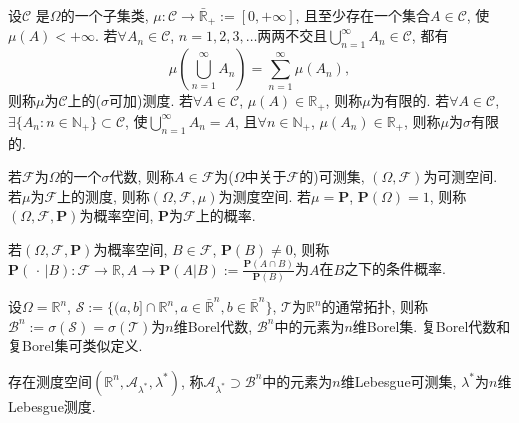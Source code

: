 \begin{definition}
    设$\mathcal{C}$ 是$\Omega$的一个子集类, $\mu\colon \mathcal{C}\to\bar{\mathbb{R} }_+:=[0,+\infty]$, 且至少存在一个集合$A\in\mathcal{C}$, 使$\mu(A)<+\infty$. 若$\forall A_n\in\mathcal{C}$, $n=1,2,3,\dots$两两不交且$\bigcup_{n=1}^{\infty}A_n\in\mathcal{C}$, 都有\begin{equation*}
        \mu\left(\bigcup_{n=1}^{\infty}A_n\right)=\sum_{n=1}^{\infty}\mu\left(A_n\right),
    \end{equation*}则称$\mu$为$\mathcal{C}$上的($\sigma$可加)测度. 若$\forall A\in\mathcal{C}$, $\mu(A)\in\mathbb{R}_+$, 则称$\mu$为有限的. 若$\forall A\in\mathcal{C}$, $\exists\{A_n\colon n\in\mathbb{N}_+\}\subset\mathcal{C} $, 使$\bigcup_{n=1}^{\infty}A_n=A$, 且$\forall n\in\mathbb{N}_+$, $\mu(A_n)\in\mathbb{R}_+$, 则称$\mu$为$\sigma$有限的. 
\end{definition}

\begin{definition}
    若$\mathcal{F}$为$\Omega$的一个$\sigma$代数, 则称$A\in\mathcal{F}$为($\Omega$中关于$\mathcal{F}$的)可测集, $(\Omega,\mathcal{F})$为可测空间. 若$\mu$为$\mathcal{F}$上的测度, 则称$(\Omega,\mathcal{F},\mu)$为测度空间. 若$\mu=\mathbf{P}$, $\mathbf{P}(\Omega)=1$, 则称$(\Omega,\mathcal{F},\mathbf{P})$为概率空间, $\mathbf{P}$为$\mathcal{F}$上的概率.
\end{definition}

\begin{definition}
    若$(\Omega,\mathcal{F},\mathbf{P})$为概率空间, $B\in\mathcal{F}$, $\mathbf{P}(B)\ne 0$, 则称$\mathbf{P}(\,\cdot\,|B)\colon \mathcal{F}\to\mathbb{R}, A\to\mathbf{P}(A|B):=\frac{\mathbf{P}(A\cap B)}{\mathbf{P}(B)}$为$A$在$B$之下的条件概率.
\end{definition}

\begin{definition}
    设$\Omega=\mathbb{R}^n$, $\mathscr{S}:=\{(a,b]\cap\mathbb{R}^n,a\in\bar{\mathbb{R}}^n,b\in\bar{\mathbb{R}}^n\}$, $\mathscr{T}$为$\mathbb{R}^n$的通常拓扑, 则称$\mathscr{B}^n:=\sigma(\mathscr{S})=\sigma(\mathscr{T})$为$n$维Borel代数, $\mathscr{B}^n$中的元素为$n$维Borel集. 复Borel代数和复Borel集可类似定义.
\end{definition}

\begin{definition}
    存在测度空间$(\mathbb{R}^n,\mathscr{A}_{\lambda^*},\lambda^*)$, 称$\mathscr{A}_{\lambda^*}\!\!\supset\!\!\mathscr{B}^n$中的元素为$n$维Lebesgue可测集, $\lambda^*$为$n$维Lebesgue测度.
\end{definition}
